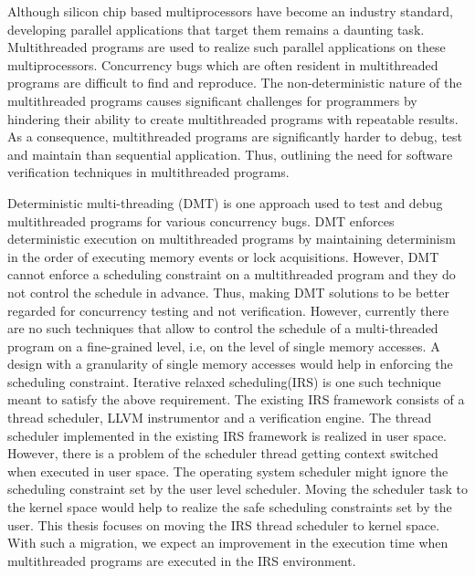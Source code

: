Although silicon chip based multiprocessors have become an industry standard, developing parallel applications that target them remains a daunting task. 
Multithreaded programs are used to realize such parallel applications on these multiprocessors.
Concurrency bugs which are often resident in multithreaded programs are difficult to find and reproduce.  
The non-deterministic nature of the multithreaded programs causes significant challenges for programmers by hindering their ability to create multithreaded programs with repeatable results. 
As a consequence, multithreaded programs are significantly harder to debug, test and maintain than sequential application. 
Thus, outlining the need for software verification techniques in multithreaded programs. 

Deterministic multi-threading (DMT) is one approach used to test and debug multithreaded programs for various concurrency bugs. 
DMT enforces deterministic execution on multithreaded programs by maintaining determinism in the order of executing memory events or lock acquisitions. 
However, DMT cannot enforce a scheduling constraint on a multithreaded program and they do not control the schedule in advance. 
Thus, making DMT solutions to be better regarded for concurrency testing and not verification. 
However, currently there are no such techniques that allow to control the schedule of a multi-threaded program on a fine-grained level, i.e, on the level of single memory accesses. 
A design with a granularity of single memory accesses would help in enforcing the scheduling constraint. 
Iterative relaxed scheduling(IRS) is one such technique meant to satisfy the above requirement. 
The existing IRS framework consists of a thread scheduler, LLVM instrumentor and a verification engine.  
The thread scheduler implemented in the existing IRS framework is realized in user space. 
However, there is a problem of the scheduler thread getting context switched when executed in user space. 
The operating system scheduler might ignore the scheduling constraint set by the user level scheduler. 
Moving the scheduler task to the kernel space would help to realize the safe scheduling constraints set by the user. 
This thesis focuses on moving the IRS thread scheduler to kernel space. 
With such a migration, we expect an improvement in the execution time when multithreaded programs are executed in the IRS environment.


